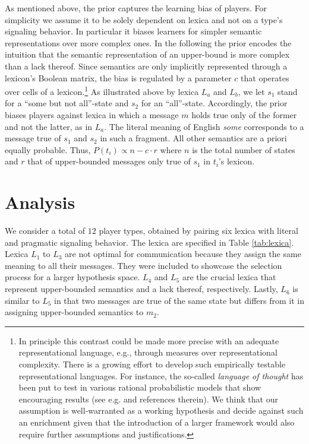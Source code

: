 \documentclass[10pt,a4paper]{article}
\begin{document}
As mentioned above, the prior captures the learning bias of players. For simplicity we assume it to be solely dependent on lexica and not on a type's signaling behavior. In particular it biases learners for simpler semantic representations over more complex ones. In the following the prior encodes the intuition that the semantic representation of an upper-bound is more complex than a lack thereof. Since semantics are only implicitly represented through a lexicon's Boolean matrix, the bias is regulated by a parameter $c$ that operates over cells of a lexicon.\footnote{In principle this contrast could be made more precise with an adequate representational language, e.g., through measures over representational complexity. There is a growing effort to develop such empirically testable representational languages. For instance, the so-called {\em language of thought} has been put  to test in various rational probabilistic models that show encouraging results (see e.g. \citealt{katz+etal:2008, piantadosi+etal:underreview, piantadosi+etal:2012a} and references therein). We think that our assumption is well-warranted as a working hypothesis and decide against such an enrichment given that the introduction of a larger framework would also require further assumptions and justifications.} As illustrated above by lexica $L_a$ and $L_b$, we let $s_1$ stand for a ``some but not all''-state and $s_2$ for an ``all''-state. Accordingly, the prior biases players against lexica in which a message $m$ holds true only of the former and not the latter, as in $L_a$. The literal meaning of English {\em some} corresponds to a message true of $s_1$ and $s_2$ in such a fragment. All other semantics are a priori equally probable. Thus, $P(t_i) \propto n - c \cdot r$ where $n$ is the total number of states and $r$ that of upper-bounded messages only true of $s_1$ in $t_i$'s lexicon.

\section{Analysis}
We consider a total of $12$ player types, obtained by pairing six lexica with literal and pragmatic signaling behavior. The lexica are specified in Table \ref{tab:lexica}. Lexica $L_1$ to $L_3$ are not optimal for communication because they assign the same meaning to all their messages. They were included to showcase the selection process for a larger hypothesis space. $L_4$ and $L_5$ are the crucial lexica that represent upper-bounded semantics and a lack thereof, respectively. Lastly, $L_6$ is similar to $L_5$ in that two messages are true of the same state but differs from it in assigning upper-bounded semantics to $m_2$. 
\end{document}
